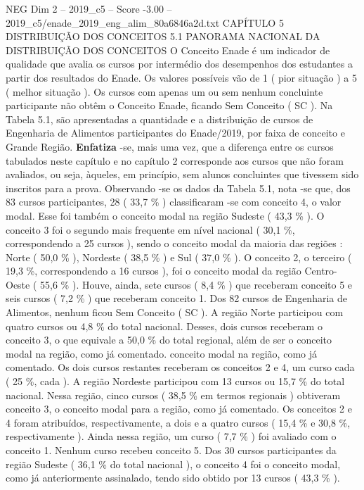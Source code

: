 \begin{textsample}{NEG Dim 2 – 2019\_c5 – Score -3.00 – 2019\_c5/enade\_2019\_eng\_alim\_80a6846a2d.txt}  \label{ex:f2_neg_094}
CAPÍTULO 5 DISTRIBUIÇÃO DOS CONCEITOS 5.1 PANORAMA NACIONAL DA DISTRIBUIÇÃO DOS CONCEITOS O Conceito Enade é um indicador de qualidade que avalia os cursos por intermédio dos desempenhos dos estudantes a partir dos resultados do Enade.
Os valores possíveis vão de 1 ( pior situação ) a 5 ( melhor situação ).
Os cursos com apenas um ou sem nenhum concluinte participante não obtêm o Conceito Enade, ficando Sem Conceito ( SC ).
Na Tabela 5.1, são apresentadas a quantidade e a distribuição de cursos de Engenharia de Alimentos participantes do Enade/2019, por faixa de conceito e Grande Região. \textbf{Enfatiza} -se, mais uma vez, que a diferença entre os cursos tabulados neste capítulo e no capítulo 2 corresponde aos cursos que não foram avaliados, ou seja, àqueles, em princípio, sem alunos concluintes que tivessem sido inscritos para a prova.
Observando -se os dados da Tabela 5.1, nota -se que, dos 83 cursos participantes, 28 ( 33,7 \% ) classificaram -se com conceito 4, o valor modal.
Esse foi também o conceito modal na região Sudeste ( 43,3 \% ).
O conceito 3 foi o segundo mais frequente em nível nacional ( 30,1 \%, correspondendo a 25 cursos ), sendo o conceito modal da maioria das regiões : Norte ( 50,0 \% ), Nordeste ( 38,5 \% ) e Sul ( 37,0 \% ).
O conceito 2, o terceiro ( 19,3 \%, correspondendo a 16 cursos ), foi o conceito modal da região Centro-Oeste ( 55,6 \% ).
Houve, ainda, sete cursos ( 8,4 \% ) que receberam conceito 5 e seis cursos ( 7,2 \% ) que receberam conceito 1.
Dos 82 cursos de Engenharia de Alimentos, nenhum ficou Sem Conceito ( SC ).
A região Norte participou com quatro cursos ou 4,8 \% do total nacional.
Desses, dois cursos receberam o conceito 3, o que equivale a 50,0 \% do total regional, além de ser o conceito modal na região, como já comentado. conceito modal na região, como já comentado.
Os dois cursos restantes receberam os conceitos 2 e 4, um curso cada ( 25 \%, cada ).
A região Nordeste participou com 13 cursos ou 15,7 \% do total nacional.
Nessa região, cinco cursos ( 38,5 \% em termos regionais ) obtiveram conceito 3, o conceito modal para a região, como já comentado.
Os conceitos 2 e 4 foram atribuídos, respectivamente, a dois e a quatro cursos ( 15,4 \% e 30,8 \%, respectivamente ).
Ainda nessa região, um curso ( 7,7 \% ) foi avaliado com o conceito 1.
Nenhum curso recebeu conceito 5.
Dos 30 cursos participantes da região Sudeste ( 36,1 \% do total nacional ), o conceito 4 foi o conceito modal, como já anteriormente assinalado, tendo sido obtido por 13 cursos ( 43,3 \% ).

\end{textsample}
